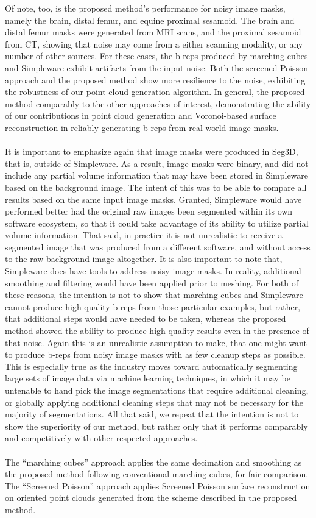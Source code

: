 %
{Of note, too, is the proposed method's performance for noisy image masks, namely the brain, distal femur, and equine proximal sesamoid. The brain and distal femur masks were generated from MRI scans, and the proximal sesamoid from CT, showing that noise may come from a either scanning modality, or any number of other sources. For these cases, the b-reps produced by marching cubes and Simpleware exhibit artifacts from the input noise. Both the screened Poisson approach and the proposed method show more resilience to the noise, exhibiting the robustness of our point cloud generation algorithm. In general, the proposed method comparably to the other approaches of interest, demonstrating the ability of our contributions in point cloud generation and Voronoi-based surface reconstruction in reliably generating b-reps from real-world image masks. \\ \\
%
It is important to emphasize again that image masks were produced in Seg3D, that is, outside of Simpleware. As a result, image masks were binary, and did not include any partial volume information that may have been stored in Simpleware based on the background image. The intent of this was to be able to compare all results based on the same input image masks. Granted, Simpleware would have performed better had the original raw images been segmented within its own software ecosystem, so that it could take advantage of its ability to utilize partial volume information. That said, in practice it is not unrealistic to receive a segmented image that was produced from a different software, and without access to the raw background image altogether. It is also important to note that, Simpleware does have tools to address noisy image masks. In reality, additional smoothing and filtering would have been applied prior to meshing. For both of these reasons, the intention is not to show that marching cubes and Simpleware cannot produce high quality b-reps from those particular examples, but rather, that additional steps would have needed to be taken, whereas the proposed method showed the ability to produce high-quality results even in the presence of that noise. Again this is an unrealistic assumption to make, that one might want to produce b-reps from noisy image masks with as few cleanup steps as possible. This is especially true as the industry moves toward automatically segmenting large sets of image data via machine learning techniques, in which it may be untenable to hand pick the image segmentations that require additional cleaning, or globally applying additional cleaning steps that may not be necessary for the majority of segmentations. All that said, we repeat that the intention is not to show the superiority of our method, but rather only that it performs comparably and competitively with other respected approaches.} \\ \\
%
The ``marching cubes'' approach applies the same decimation and smoothing as the proposed method following conventional marching cubes, for fair comparison. The ``Screened Poisson'' approach applies Screened Poisson surface reconstruction on oriented point clouds generated from the scheme described in the proposed method.